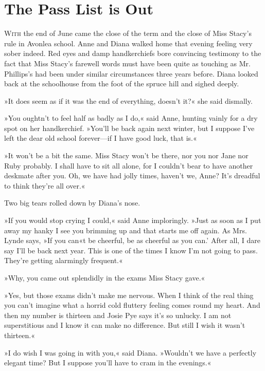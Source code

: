 \chapter{The Pass List is Out}

\lettrine[lines=4]{W}{ith} the end of June came the close of the term and the close of Miss Stacy's rule in Avonlea school. Anne and Diana walked home that evening feeling very sober indeed. Red eyes and damp handkerchiefs bore convincing testimony to the fact that Miss Stacy's farewell words must have been quite as touching as Mr. Phillips's had been under similar circumstances three years before. Diana looked back at the schoolhouse from the foot of the spruce hill and sighed deeply.

»It does seem as if it was the end of everything, doesn't it?« she said dismally.

»You oughtn't to feel half as badly as I do,« said Anne, hunting vainly for a dry spot on her handkerchief. »You'll be back again next winter, but I suppose I've left the dear old school forever—if I have good luck, that is.«

»It won't be a bit the same. Miss Stacy won't be there, nor you nor Jane nor Ruby probably. I shall have to sit all alone, for I couldn't bear to have another deskmate after you. Oh, we have had jolly times, haven't we, Anne? It's dreadful to think they're all over.«

Two big tears rolled down by Diana's nose.

»If you would stop crying I could,« said Anne imploringly. »Just as soon as I put away my hanky I see you brimming up and that starts me off again. As Mrs. Lynde says, »If you can«t be cheerful, be as cheerful as you can.' After all, I dare say I'll be back next year. This is one of the times I know I'm not going to pass. They're getting alarmingly frequent.«

»Why, you came out splendidly in the exams Miss Stacy gave.«

»Yes, but those exams didn't make me nervous. When I think of the real thing you can't imagine what a horrid cold fluttery feeling comes round my heart. And then my number is thirteen and Josie Pye says it's so unlucky. I am not superstitious and I know it can make no difference. But still I wish it wasn't thirteen.«

»I do wish I was going in with you,« said Diana. »Wouldn't we have a perfectly elegant time? But I suppose you'll have to cram in the evenings.«

